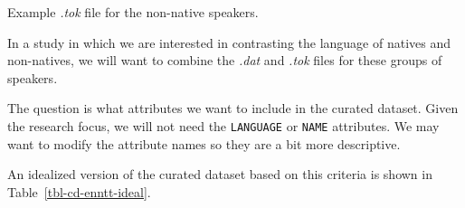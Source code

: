 \documentclass[
  letterpaper,
  DIV=11,
  numbers=noendperiod]{scrreprt}
\newenvironment{Shaded}{\begin{snugshade}}{\end{snugshade}}
\newcommand{\NormalTok}[1]{\textcolor[rgb]{0.00,0.00,0.00}{#1}}
\theoremstyle{definition}
\theoremstyle{remark}
\begin{document}
\begin{codelisting}

\caption{\label{lst-cd-enntt-nonnatives-tok}Example \emph{.tok} file for
the non-native speakers.}

\centering{

\begin{Shaded}
\begin{Highlighting}[]
\NormalTok{The Commission is following with interest the planned construction of a nuclear power plant in Akkuyu , Turkey and recognises the importance of ensuring that the construction of the new plant follows the highest internationally accepted nuclear safety standards .}
\NormalTok{According to our information , the decision on the selection of a bidder has not been taken yet .}
\end{Highlighting}
\end{Shaded}

}

\end{codelisting}%

In a study in which we are interested in contrasting the language of
natives and non-natives, we will want to combine the \emph{.dat} and
\emph{.tok} files for these groups of speakers.

The question is what attributes we want to include in the curated
dataset. Given the research focus, we will not need the
\texttt{LANGUAGE} or \texttt{NAME} attributes. We may want to modify the
attribute names so they are a bit more descriptive.

An idealized version of the curated dataset based on this criteria is
shown in Table~\ref{tbl-cd-enntt-ideal}.
\end{document}
